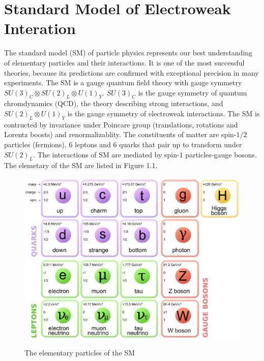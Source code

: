 
\chapter{Standard Model of Electroweak Interation}
The standard model (SM) of particle physics represents our best understanding of elementary particles and their interactions. It is one of the most successful theories, because its predictions are confirmed with exceptional precision in many experiments. The SM is a gauge quantum field theory with gauge symmetry $SU(3)_C \otimes SU(2)_L \otimes U(1)_Y$\cite{Glashow1961,Weinberg,Salam,GIM,GG,Pol,Pol1,GrossWil,GrossWil1, SWQCD, SWQCD1,SW,thooft1,thooft2,tHooftVeltman,tHV}. $SU(3)_C$ is the gauge symmetry of quantum chromdynamics (QCD), the theory describing strong interactions, and $SU(2)_L \otimes U(1)_Y$ is the gauge symmetry of electroweak interactions. The SM is contructed by invariance under Poincare group (translations, rotations and Lorentz boosts) and renormalizablity. The constituents of matter are spin-$1/2$ particles (fermions), 6 leptons and 6 quarks that pair up to transform under $SU(2)_L$. The interactions of SM are mediated by spin-$1$ particles-gauge bosons. The elemetary of the SM are listed in Figure 1.1.
\begin{figure}
	\begin{center}
		\includegraphics[scale=0.45]{Particle.eps}\\
		\caption{ The elementary particles of the SM  }
	\end{center}
\end{figure}

